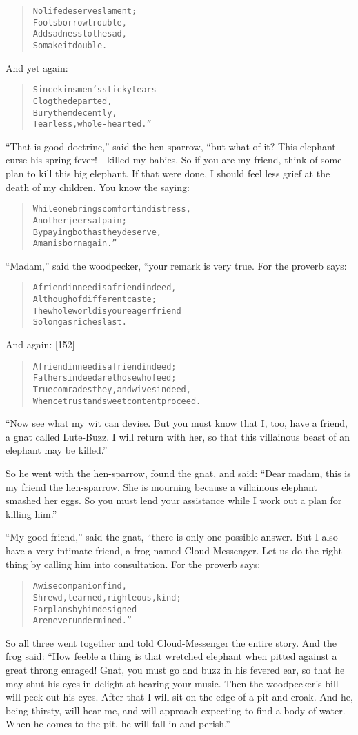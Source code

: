 \documentclass[article, twoside, 14pt]{memoir}
\renewenvironment{verbatim}{%
\begin{quote}%
\vskip -10pt%
\begin{alltt}\normalfont\large}{\end{alltt}%
\end{quote}%
\vskip -10pt
} %
\begin{document}
\begin{verbatim}
No life deserves lament;
    Fools borrow trouble,
Add sadness to the sad,
    So make it double.
\end{verbatim}
And yet again:

\begin{verbatim}
Since kinsmen's sticky tears
    Clog the departed,
Bury them decently,
    Tearless, whole-hearted.”
\end{verbatim}
``That is good doctrine,'' said the hen-sparrow, “but what of it?
This elephant---curse his spring fever!---killed my babies. So if
you are my friend, think of some plan to kill this big elephant. If
that were done, I should feel less grief at the death of my
children. You know the saying:

\begin{verbatim}
While one brings comfort in distress,
    Another jeers at pain;
By paying both as they deserve,
    A man is born again.”
\end{verbatim}
``Madam,'' said the woodpecker, “your remark is very true. For the
proverb says:

\begin{verbatim}
A friend in need is a friend indeed,
    Although of different caste;
The whole world is your eager friend
    So long as riches last.
\end{verbatim}
And again: [152]

\begin{verbatim}
A friend in need is a friend indeed;
Fathers indeed are those who feed;
True comrades they, and wives indeed,
Whence trust and sweet content proceed.
\end{verbatim}
``Now see what my wit can devise. But you must know that I, too, have a friend, a gnat called Lute-Buzz. I will return with her, so that this villainous beast of an elephant may be killed.''

So he went with the hen-sparrow, found the gnat, and said:
``Dear madam, this is my friend the hen-sparrow. She is mourning because a villainous elephant smashed her eggs. So you must lend your assistance while I work out a plan for killing him.''

``My good friend,'' said the gnat, “there is only one possible
answer. But I also have a very intimate friend, a frog named
Cloud-Messenger. Let us do the right thing by calling him into
consultation. For the proverb says:

\begin{verbatim}
A wise companion find,
Shrewd, learned, righteous, kind;
For plans by him designed
Are never undermined.”
\end{verbatim}
So all three went together and told Cloud-Messenger the entire
story. And the frog said:
``How feeble a thing is that wretched elephant when pitted against a great throng enraged! Gnat, you must go and buzz in his fevered ear, so that he may shut his eyes in delight at hearing your music. Then the woodpecker's bill will peck out his eyes. After that I will sit on the edge of a pit and croak. And he, being thirsty, will hear me, and will approach expecting to find a body of water. When he comes to the pit, he will fall in and perish.''
\end{document}
